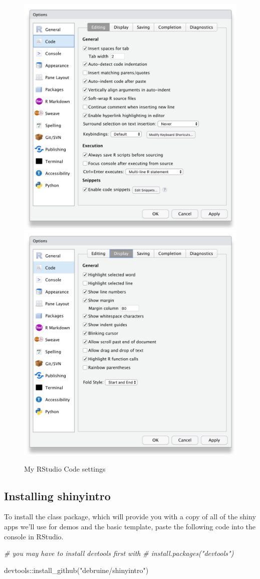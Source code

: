 \documentclass[
]{book}
\newenvironment{Shaded}{\begin{snugshade}}{\end{snugshade}}
\newcommand{\CommentTok}[1]{\textcolor[rgb]{0.56,0.35,0.01}{\textit{#1}}}
\newcommand{\FunctionTok}[1]{\textcolor[rgb]{0.00,0.00,0.00}{#1}}
\newcommand{\NormalTok}[1]{#1}
\newcommand{\SpecialCharTok}[1]{\textcolor[rgb]{0.00,0.00,0.00}{#1}}
\newcommand{\StringTok}[1]{\textcolor[rgb]{0.31,0.60,0.02}{#1}}
\begin{document}
\begin{figure}

{\centering \includegraphics[width=0.45\linewidth]{images/rstudio_settings_code_editing} \includegraphics[width=0.45\linewidth]{images/rstudio_settings_code_display} 

}

\caption{My RStudio Code settings}\label{fig:settings-code}
\end{figure}

\hypertarget{installing-shinyintro-1}{%
\subsection{Installing shinyintro}\label{installing-shinyintro-1}}

To install the class package, which will provide you with a copy of all of the shiny apps we'll use for demos and the basic template, paste the following code into the console in RStudio.

\begin{Shaded}
\begin{Highlighting}[]
\CommentTok{\# you may have to install devtools first with }
\CommentTok{\# install.packages("devtools")}

\NormalTok{devtools}\SpecialCharTok{::}\FunctionTok{install\_github}\NormalTok{(}\StringTok{"debruine/shinyintro"}\NormalTok{)}
\end{Highlighting}
\end{Shaded}
\end{document}
